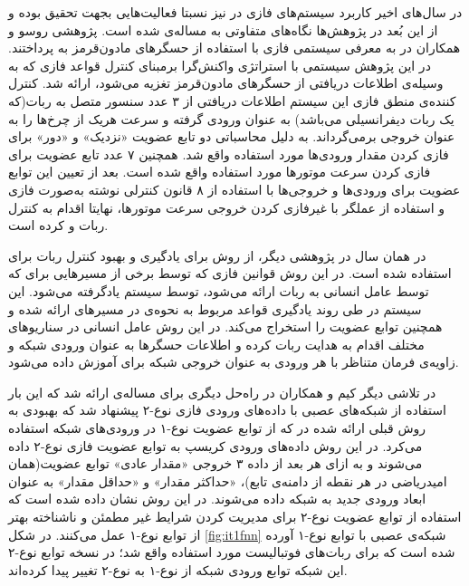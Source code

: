 در سال‌های اخیر کاربرد سیستم‌های فازی در  نیز نسبتا فعالیت‌هایی بجهت تحقیق بوده و از این بُعد در پژوهش‌ها نگاه‌های متفاوتی به مساله‌ی  شده است. پژوهشی روسو و همکاران در  به معرفی سیستمی فازی با استفاده از حسگرهای مادون‌قرمز به  پرداختند. در این پژوهش سیستمی با استراتژی واکنش‌گرا برمبنای کنترل قواعد فازی که به وسیله‌ی اطلاعات دریافتی از حسگرهای مادون‌قرمز تغزیه می‌شود، ارائه شد. کنترل کننده‌ی منطق فازی این سیستم اطلاعات دریافتی از ۳ عدد سنسور متصل به ربات(که یک ربات دیفرانسیلی می‌باشد) به عنوان ورودی گرفته و سرعت هریک از چرخ‌ها را به عنوان خروجی برمی‌گرداند. به دلیل محاسباتی دو تابع عضویت «نزدیک» و «دور» برای فازی کردن مقدار ورودی‌ها مورد استفاده واقع شد. همچنین ۷ عدد تابع عضویت برای فازی کردن سرعت موتورها مورد استفاده واقع شده است. بعد از تعیین این توابع عضویت برای ورودی‌ها و خروجی‌ها با استفاده از ۸ قانون کنترلی نوشته به‌صورت فازی و استفاده از عملگر  با غیرفازی کردن خروجی سرعت موتورها، نهایتا اقدام به کنترل ربات و  کرده است.

در همان سال در پژوهشی دیگر، از روش  برای یادگیری و بهبود کنترل ربات برای  استفاده شده است. در این روش قوانین فازی که توسط برخی از مسیرهایی برای  که توسط عامل انسانی به ربات ارائه می‌شود، توسط سیستم  یادگرفته می‌شود. این سیستم در طی روند یادگیری قواعد مربوط به نحوه‌ی  در مسیرهای ارائه شده و همچنین توابع عضویت را استخراج می‌کند. در این روش عامل انسانی در سناریو‌های مختلف اقدام به هدایت ربات کرده و اطلاعات حسگرها به عنوان ورودی شبکه و زاویه‌ی فرمان متناظر با هر ورودی به عنوان خروجی شبکه برای آموزش داده می‌شود.

در تلاشی دیگر کیم و همکاران در  راه‌حل دیگری برای مساله‌ی  ارائه شد که این بار استفاده‌ از شبکه‌های عصبی با داده‌های ورودی فازی نوع-۲ پیشنهاد شد که بهبودی به روش قبلی ارائه شده در  که از توابع عضویت نوع-۱ در ورودی‌های شبکه استفاده می‌کرد. در این روش داده‌های ورودی کریسپ به توابع عضویت فازی نوع-۲ داده می‌شوند و به ازای هر بعد از داده ۳ خروجی «مقدار عادی» توابع عضویت(همان امیدریاضی در هر نقطه از دامنه‌ی تابع)، «حداکثر مقدار» و «حداقل مقدار» به عنوان ابعاد ورودی جدید به شبکه داده می‌شوند. در این روش نشان داده شده است که استفاده از توابع عضویت نوع-۲ برای مدیریت کردن شرایط غیر مطمئن و ناشناخته بهتر از توابع نوع-۱ عمل می‌کنند. در شکل \ref{fig:it1fnn} شبکه‌ی عصبی با توابع نوع-۱ آورده شده است که برای ربات‌های فوتبالیست مورد استفاده واقع شد؛ در نسخه توابع نوع-۲ این شبکه توابع ورودی شبکه از نوع-۱ به نوع-۲ تغییر پیدا کرده‌اند.


